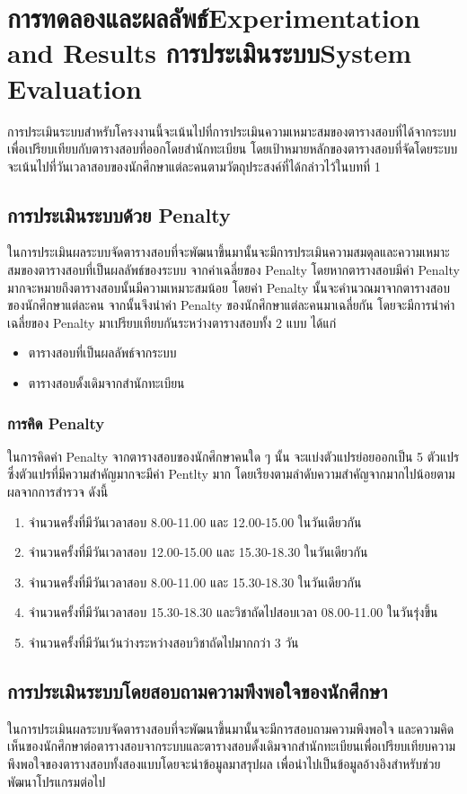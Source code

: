 \chapter{\ifproject%
\ifcpe การทดลองและผลลัพธ์\else Experimentation and Results\fi
\else%
\ifcpe การประเมินระบบ\else System Evaluation\fi
\fi}

การประเมินระบบสำหรับโครงงานนี้จะเน้นไปที่การประเมินความเหมาะสมของตารางสอบที่ได้จากระบบ
\linebreak
เพื่อเปรียบเทียบกับตารางสอบที่ออกโดยสำนักทะเบียน 
โดยเป้าหมายหลักของตารางสอบที่จัดโดยระบบจะเน้นไปที่วันเวลาสอบของนักศึกษาแต่ละคนตามวัตถุประสงค์ที่ได้กล่าวไว้ในบทที่ 1

\section{การประเมินระบบด้วย Penalty}
ในการประเมินผลระบบจัดตารางสอบที่จะพัฒนาขึ้นมานั้นจะมีการประเมินความสมดุลและความเหมาะสมของตารางสอบที่เป็นผลลัพธ์ของระบบ จากค่าเฉลี่ยของ Penalty 
โดยหากตารางสอบมีค่า Penalty มากจะหมายถึงตารางสอบนั้นมีความเหมาะสมน้อย โดยค่า Penalty นั้นจะคำนวณมาจากตารางสอบของนักศึกษาแต่ละคน
จากนั้นจึงนำค่า Penalty ของนักศึกษาแต่ละคนมาเฉลี่ยกัน 
โดยจะมีการนำค่าเฉลี่ยของ Penalty มาเปรียบเทียบกันระหว่างตารางสอบทั้ง 2 แบบ
ได้แก่
\begin{itemize}
    \item ตารางสอบที่เป็นผลลัพธ์จากระบบ
    \item ตารางสอบดั้งเดิมจากสำนักทะเบียน
\end{itemize}

\subsection{การคิด Penalty}
ในการคิดค่า Penalty จากตารางสอบของนักศึกษาคนใด ๆ นั้น จะแบ่งตัวแปรย่อยออกเป็น 5 ตัวแปร 
ซึ่งตัวแปรที่มีความสำคัญมากจะมีค่า Pentlty มาก โดยเรียงตามลำดับความสำคัญจากมากไปน้อยตามผลจากการสำรวจ ดังนี้
\begin{enumerate}
    \item จำนวนครั้งที่มีวันเวลาสอบ 8.00-11.00 และ 12.00-15.00 ในวันเดียวกัน
    \item จำนวนครั้งที่มีวันเวลาสอบ 12.00-15.00 และ 15.30-18.30 ในวันเดียวกัน
    \item จำนวนครั้งที่มีวันเวลาสอบ 8.00-11.00 และ 15.30-18.30 ในวันเดียวกัน
    \item จำนวนครั้งที่มีวันเวลาสอบ 15.30-18.30 และวิชาถัดไปสอบเวลา 08.00-11.00 ในวันรุ่งขึ้น
    \item จำนวนครั้งที่มีวันเว้นว่างระหว่างสอบวิชาถัดไปมากกว่า 3 วัน
\end{enumerate}

\section{การประเมินระบบโดยสอบถามความพึงพอใจของนักศึกษา}
ในการประเมินผลระบบจัดตารางสอบที่จะพัฒนาขึ้นมานั้นจะมีการสอบถามความพึงพอใจ
และความคิดเห็นของนักศึกษาต่อตารางสอบจากระบบและตารางสอบดั้งเดิมจากสำนักทะเบียนเพื่อเปรียบเทียบความพึงพอใจของตารางสอบทั้งสองแบบโดยจะนำข้อมูลมาสรุปผล เพื่อนำไปเป็นข้อมูลอ้างอิงสำหรับช่วย
พัฒนาโปรแกรมต่อไป